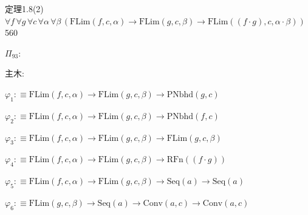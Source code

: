 \begin{fullproof}{定理1.8(2)}{$\forall f\,\forall g\,\forall c\,\forall \alpha\,\forall \beta\,(\mathrm{FLim}(f,c,\alpha) \to \mathrm{FLim}(g,c,\beta) \to \mathrm{FLim}((f \cdot g),c,\alpha \cdot \beta))$}{560}
\begin{ptree}
\end{ptree}
\noindent$\Pi_{93}$:
\begin{ptree}
\noLine
{}
\noLine
{}
\noLine
{}
\end{ptree}
\noindent 主木:
\begin{ptree}
\noLine
{}
\noLine
{}
\noLine
{}
\end{ptree}
\begin{abbrevlist}
\item $\varphi_{1} :\equiv \mathrm{FLim}(f,c,\alpha) \to \mathrm{FLim}(g,c,\beta) \to \mathrm{PNbhd}(g,c)$
\item $\varphi_{2} :\equiv \mathrm{FLim}(f,c,\alpha) \to \mathrm{FLim}(g,c,\beta) \to \mathrm{PNbhd}(f,c)$
\item $\varphi_{3} :\equiv \mathrm{FLim}(f,c,\alpha) \to \mathrm{FLim}(g,c,\beta) \to \mathrm{FLim}(g,c,\beta)$
\item $\varphi_{4} :\equiv \mathrm{FLim}(f,c,\alpha) \to \mathrm{FLim}(g,c,\beta) \to \mathrm{RFn}((f \cdot g))$
\item $\varphi_{5} :\equiv \mathrm{FLim}(f,c,\alpha) \to \mathrm{FLim}(g,c,\beta) \to \mathrm{Seq}(a) \to \mathrm{Seq}(a)$
\item $\varphi_{6} :\equiv \mathrm{FLim}(g,c,\beta) \to \mathrm{Seq}(a) \to \mathrm{Conv}(a,c) \to \mathrm{Conv}(a,c)$

\end{abbrevlist}
\end{fullproof}
